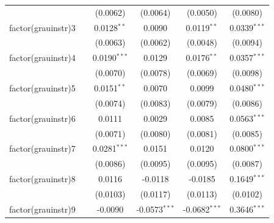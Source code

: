 \begin{tabular}{lccccc}
                            &                       & (0.0062)                & (0.0064)                & (0.0050)                & (0.0080)\\   
   factor(grauinstr)3       &                       & 0.0128$^{**}$           & 0.0090                  & 0.0119$^{**}$           & 0.0339$^{***}$\\   
                            &                       & (0.0063)                & (0.0062)                & (0.0048)                & (0.0094)\\   
   factor(grauinstr)4       &                       & 0.0190$^{***}$          & 0.0129                  & 0.0176$^{**}$           & 0.0357$^{***}$\\   
                            &                       & (0.0070)                & (0.0078)                & (0.0069)                & (0.0098)\\   
   factor(grauinstr)5       &                       & 0.0151$^{**}$           & 0.0070                  & 0.0099                  & 0.0480$^{***}$\\   
                            &                       & (0.0074)                & (0.0083)                & (0.0079)                & (0.0086)\\   
   factor(grauinstr)6       &                       & 0.0111                  & 0.0029                  & 0.0085                  & 0.0563$^{***}$\\   
                            &                       & (0.0071)                & (0.0080)                & (0.0081)                & (0.0085)\\   
   factor(grauinstr)7       &                       & 0.0281$^{***}$          & 0.0151                  & 0.0120                  & 0.0800$^{***}$\\   
                            &                       & (0.0086)                & (0.0095)                & (0.0095)                & (0.0087)\\   
   factor(grauinstr)8       &                       & 0.0116                  & -0.0118                 & -0.0185                 & 0.1649$^{***}$\\   
                            &                       & (0.0103)                & (0.0117)                & (0.0113)                & (0.0102)\\   
   factor(grauinstr)9       &                       & -0.0090                 & -0.0573$^{***}$         & -0.0682$^{***}$         & 0.3646$^{***}$\\   

\end{tabular}
